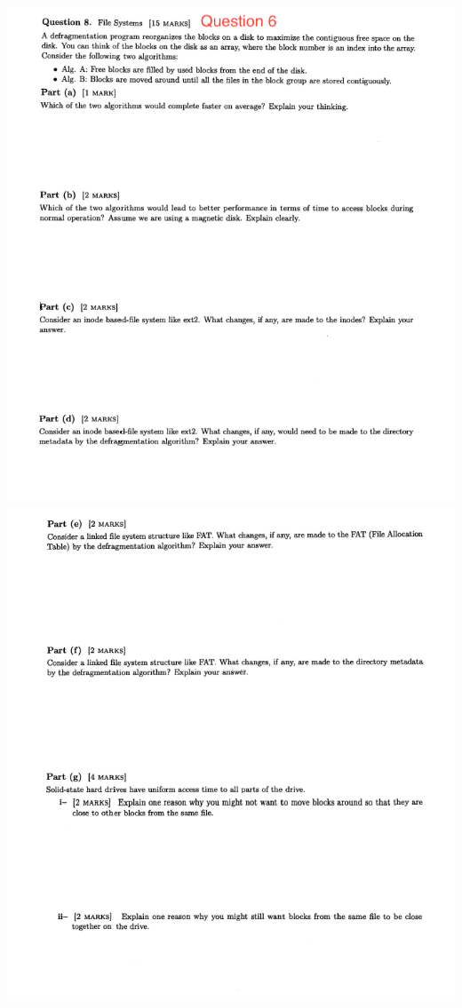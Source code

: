 \documentclass[12pt]{article}
\begin{document}
\begin{center}
\includegraphics[width=\linewidth]{../images/midterm_4_9.png}
\includegraphics[width=\linewidth]{../images/midterm_4_10.png}
\end{center}
\end{document}
